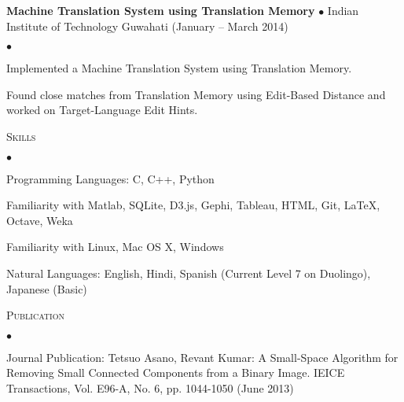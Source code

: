 \documentclass[10pt]{article}
\newcommand{\lineunder}{\\\vspace{-9pt}\hrulefill}
\newcommand{\header}[1]{{\normalsize\scshape{#1}} \lineunder}
\newcommand{\project}[3]{{ \textbf{#1} $\bullet$ #2 \hfill (#3)\\  }}
\newenvironment{achievements}{\begin{list}{$\bullet$}{\topsep 0pt \itemsep 0pt}}{\end{list}}
\begin{document}
\project{Machine Translation System using Translation Memory}{Indian Institute of Technology Guwahati}{January -- March 2014}
	\begin{achievements}
	\item Implemented a Machine Translation System using Translation Memory.
	\item Found close matches from Translation Memory using Edit-Based Distance and worked on Target-Language Edit Hints.
	\end{achievements}	
	
\vspace{3pt}

\header{Skills}
\begin{achievements}
\item Programming Languages: C, C++, Python
\item Familiarity with Matlab, SQLite, D3.js, Gephi, Tableau, HTML, Git, \LaTeX, Octave, Weka%
\item Familiarity with Linux, Mac OS X, Windows
\item Natural Languages: English, Hindi, Spanish (Current Level 7 on Duolingo), Japanese (Basic)
\end{achievements}
	
\vspace{3pt}
	
\header{Publication}%
\begin{achievements}
\item Journal Publication: Tetsuo Asano, Revant Kumar: A Small-Space Algorithm for Removing Small Connected Components from a Binary Image. IEICE Transactions, Vol. E96-A, No. 6, pp. 1044-1050 (June 2013)
\end{achievements} 
\end{document}
